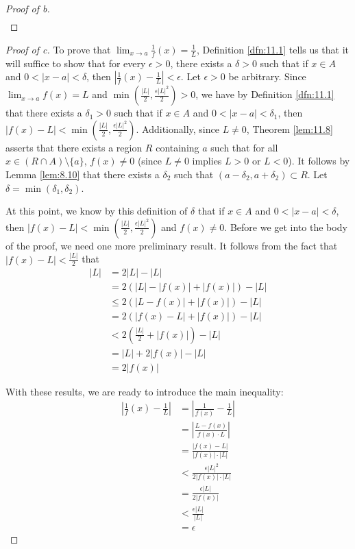 \documentclass[../main.tex]{subfiles}
\begin{document}
\begin{theorem}
\begin{proof}[Proof of b]
\begin{align*}
        \end{align*}
    \end{proof}
    \begin{proof}[Proof of c]
        To prove that $\lim_{x\to a}\frac{1}{f}(x)=\frac{1}{L}$, Definition \ref{dfn:11.1} tells us that it will suffice  to show that for every $\epsilon>0$, there exists a $\delta>0$ such that if $x\in A$ and $0<|x-a|<\delta$, then $|\frac{1}{f}(x)-\frac{1}{L}|<\epsilon$. Let $\epsilon>0$ be arbitrary. Since $\lim_{x\to a}f(x)=L$ and $\min(\frac{|L|}{2},\frac{\epsilon|L|^2}{2})>0$, we have by Definition \ref{dfn:11.1} that there exists a $\delta_1>0$ such that if $x\in A$ and $0<|x-a|<\delta_1$, then $|f(x)-L|<\min(\frac{|L|}{2},\frac{\epsilon|L|^2}{2})$. Additionally, since $L\neq 0$, Theorem \ref{lem:11.8} asserts that there exists a region $R$ containing $a$ such that for all $x\in(R\cap A)\setminus\{a\}$, $f(x)\neq 0$ (since $L\neq 0$ implies $L>0$ or $L<0$). It follows by Lemma \ref{lem:8.10} that there exists a $\delta_2$ such that $(a-\delta_2,a+\delta_2)\subset R$. Let $\delta=\min(\delta_1,\delta_2)$.\par
        At this point, we know by this definition of $\delta$ that if $x\in A$ and $0<|x-a|<\delta$, then $|f(x)-L|<\min(\frac{|L|}{2},\frac{\epsilon|L|^2}{2})$ and $f(x)\neq 0$. Before we get into the body of the proof, we need one more preliminary result. It follows from the fact that $|f(x)-L|<\frac{|L|}{2}$ that
        \begin{align*}
            |L| &= 2|L|-|L|\\
            &= 2(|L|-|f(x)|+|f(x)|)-|L|\\
            &\leq 2(|L-f(x)|+|f(x)|)-|L|\\
            &= 2(|f(x)-L|+|f(x)|)-|L|\\
            &< 2\left( \frac{|L|}{2}+|f(x)| \right)-|L|\\
            &= |L|+2|f(x)|-|L|\\
            &= 2|f(x)|
        \end{align*}\par
        With these results, we are ready to introduce the main inequality:
        \begin{align*}
            \left| \frac{1}{f}(x)-\frac{1}{L} \right| &= \left| \frac{1}{f(x)}-\frac{1}{L} \right|\\
            &= \left| \frac{L-f(x)}{f(x)\cdot L} \right|\\
            &= \frac{|f(x)-L|}{|f(x)|\cdot|L|}\\
            &< \frac{\epsilon|L|^2}{2|f(x)|\cdot|L|}\\
            &= \frac{\epsilon|L|}{2|f(x)|}\\
            &< \frac{\epsilon|L|}{|L|}\\
            &= \epsilon
        \end{align*}
    \end{proof}
\end{theorem}
\end{document}
